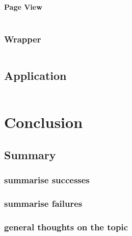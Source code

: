 \documentclass[11pt, a4paper, oneside]{report}
\begin{document}
\inputminted[frame=lines,fontsize=\scriptsize,xleftmargin=\parindent,linenos]{R}{R/time-series.R}

\subsubsection{Page View}\label{sec:page-view}

\inputminted[frame=lines,fontsize=\scriptsize,xleftmargin=\parindent,linenos]{R}{R/page-view.R}

\subsection{Wrapper}\label{sec:wrapper-1}

\inputminted[frame=lines,fontsize=\scriptsize,xleftmargin=\parindent,linenos]{R}{R/get-vis.R}

\section{Application}\label{sec:application}

\inputminted[frame=lines,fontsize=\scriptsize,xleftmargin=\parindent,linenos]{R}{R/app.R}

\chapter{Conclusion}\label{cha:conclusion}

\section{Summary}\label{sec:summary}

\subsection{summarise successes}
\subsection{summarise failures}
\subsection{general thoughts on the topic}
\end{document}
